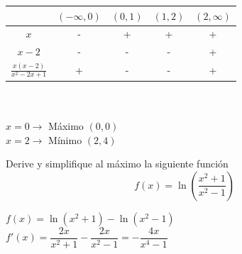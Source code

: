 \documentclass[addpoints,spanish, 12pt,a4paper]{exam}
\begin{document}
\begin{questions}
\begin{parts}
\begin{solution}
        \begin{tabular}{c|c|c|c|c}
            & $(-\infty,0)$ & $(0,1)$ & $(1,2)$ & $(2,\infty)$ \\
            \hline
           $x$ & - & + & + & + \\
           $x-2$ & - & - & - & + \\
           \hline
           $\frac{x \left(x - 2\right)}{x^{2} - 2 x + 1}$ & + & - & - & + \\
        \end{tabular}\\ \\
    $x=0 \to$ Máximo $(0,0)$ \\
    $x=2 \to$ Mínimo $(2,4)$\\
\end{solution}
\end{parts}

\question[2] Derive y simplifique al máximo la siguiente función  
\[
f(x) = \ln \left( \frac{x^2 + 1}{x^2 - 1} \right)
\]
\begin{solution}
    $f(x)=\ln(x^2+1) - \ln(x^2-1)$\\
    $f'(x)=\dfrac{2x}{x^2+1}-\dfrac{2x}{x^2-1}=- \dfrac{4 x}{x^{4} - 1}$
\end{solution}

\addpoints

\end{questions}
\end{document}
